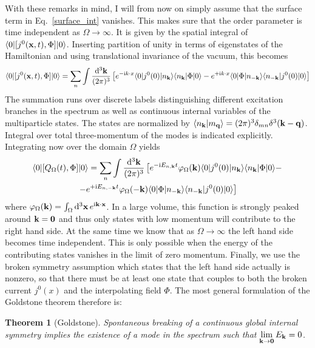 \documentclass[final,3p,times,12pt,a4paper,sort&compress]{elsarticle}
\newcommand\vek[1]{{\boldsymbol{\bf #1}}}   %
\newcommand\skal[2]{\vek{#1}\cdot\vek{#2}}  %
\newcommand\bra[1]{\langle#1\vert}          %
\newcommand\ket[1]{\vert#1\rangle}          %
\newcommand\braket[2]{\langle#1\vert#2\rangle} %
\newcommand\imag{\mathrm i}                 %
\newcommand\thname{Theorem}
\newtheorem{theorem}{\thname}
\newcommand\vp{\varphi}
\newcommand\dthree{\mathop{{\rm d}^3\!}\nolimits} %
\begin{document}
With these remarks in mind, I will from now on simply assume that the surface
term in Eq.~\eqref{surface_int} vanishes. This makes sure that the order
parameter is time independent as $\Omega\to\infty$. It is given by the spatial
integral of $\bra0[j^0(\vek x,t),\Phi]\ket0$. Inserting partition of unity in
terms of eigenstates of the Hamiltonian and using translational invariance of
the vacuum, this becomes
\begin{equation}
\bra0[j^0(\vek x,t),\Phi]\ket0=\sum_n\int\frac{\dthree\vek k}{(2\pi)^3}
\left[e^{-\imag k\cdot x}\bra0j^0(0)\ket{n_{\vek k}}\bra{n_{\vek k}}\Phi\ket0-
e^{+\imag k\cdot x}\bra0\Phi\ket{n_{-\vek k}}\bra{n_{-\vek k}}j^0(0)\ket0
\right]
\label{Goldstone_proof}
\end{equation}
The summation runs over discrete labels distinguishing different excitation
branches in the spectrum as well as continuous internal variables of the
multiparticle states. The states are normalized by $\braket{n_{\vek k}}{m_{\vek
q}}=(2\pi)^3\delta_{mn}\delta^3(\vek k-\vek q)$. Integral over total
three-momentum of the modes is indicated explicitly. Integrating now over the
domain $\Omega$ yields
\begin{multline}
\bra0[Q_\Omega(t),\Phi]\ket0=\sum_n\int\frac{\dthree\vek k}{(2\pi)^3}
\left[e^{-\imag E_{n,\vek k}t}\vp_\Omega(\vek k)\bra0j^0(0)
\ket{n_{\vek k}}\bra{n_{\vek k}}\Phi\ket0-\right.\\
\left.-e^{+\imag E_{n,-\vek k}t}\vp_\Omega(-\vek k)
\bra0\Phi\ket{n_{-\vek k}}\bra{n_{-\vek k}}j^0(0)\ket0 \right]
\label{Goldstone_proof2}
\end{multline}
where $\vp_\Omega(\vek k)=\int_\Omega\dthree\vek x\,e^{\imag\skal kx}$. In a
large volume, this function is strongly peaked around $\vek k=\vek0$ and thus
only states with low momentum will contribute to the right hand side. At the
same time we know that as $\Omega\to\infty$ the left hand side becomes time
independent. This is only possible when the energy of the contributing states
vanishes in the limit of zero momentum. Finally, we use the broken symmetry
assumption which states that the left hand side actually is nonzero, so that
there must be at least one state that couples to both the broken current
$j^0(x)$ and the interpolating field $\Phi$. The most general formulation of
the Goldstone theorem therefore is:
\begin{theorem}[Goldstone]
Spontaneous breaking of a continuous global internal symmetry implies the
existence of a mode in the spectrum such that $\lim\limits_{\vek
k\to\vek0}E_{\vek k}=0$.
\end{theorem}
\end{document}
